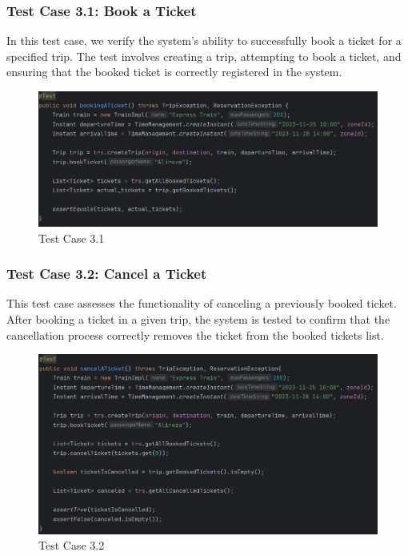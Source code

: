 \documentclass{article}
\begin{document}
\subsubsection{Test Case 3.1: Book a Ticket}

In this test case, we verify the system's ability to successfully book a ticket for a specified trip. The test involves creating a trip, attempting to book a ticket, and ensuring that the booked ticket is correctly registered in the system.

\begin{figure}[h]
  \centering
  \includegraphics[width=1.0\textwidth]{pictures/T3-1.png}
  \caption{Test Case 3.1}
  \label{fig:your_label}
\end{figure}

\pagebreak

\subsubsection{Test Case 3.2: Cancel a Ticket}

This test case assesses the functionality of canceling a previously booked ticket. After booking a ticket in a given trip, the system is tested to confirm that the cancellation process correctly removes the ticket from the booked tickets list.

\begin{figure}[h]
  \centering
  \includegraphics[width=1.0\textwidth]{pictures/T3-2.png}
  \caption{Test Case 3.2}
  \label{fig:your_label}
\end{figure}
\end{document}
